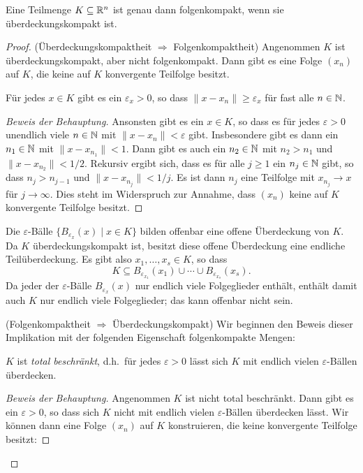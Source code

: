 \documentclass[a4paper,10pt]{article}
\begin{document}
\begin{prop}
 Eine Teilmenge $K \subseteq \mathbb{R}^n$ ist genau dann folgenkompakt, wenn sie überdeckungskompakt ist.
\end{prop}
\begin{proof}
 (Überdeckungskompaktheit $\Rightarrow$ Folgenkompaktheit) Angenommen $K$ ist überdeckungskompakt, aber nicht folgenkompakt. Dann gibt es eine Folge $(x_n)$ auf $K$, die keine auf $K$ konvergente Teilfolge besitzt.
 
 \begin{beh}
  Für jedes $x \in K$ gibt es ein $\varepsilon_x > 0$, so dass $\|x - x_n\| \geq \varepsilon_x$ für fast alle $n \in \mathbb{N}$.
 \end{beh}
 \begin{proof}[Beweis der Behauptung]
  Ansonsten gibt es ein $x \in K$, so dass es für jedes $\varepsilon > 0$ unendlich viele $n \in \mathbb{N}$ mit $\|x - x_n\| < \varepsilon$ gibt. Insbesondere gibt es dann ein $n_1 \in \mathbb{N}$ mit $\|x - x_{n_1}\| < 1$. Dann gibt es auch ein $n_2 \in \mathbb{N}$ mit $n_2 > n_1$ und $\|x - x_{n_2}\| < 1/2$. Rekursiv ergibt sich, dass es für alle $j \geq 1$ ein $n_j \in \mathbb{N}$ gibt, so dass $n_j > n_{j-1}$ und $\|x - x_{n_j}\| < 1/j$. Es ist dann $n_j$ eine Teilfolge mit $x_{n_j} \to x$ für $j \to \infty$. Dies steht im Widerspruch zur Annahme, dass $(x_n)$ keine auf $K$ konvergente Teilfolge besitzt.
 \end{proof}
 
 Die $\varepsilon$-Bälle $\{B_{\varepsilon_x}(x) \mid x \in K\}$ bilden offenbar eine offene Überdeckung von $K$. Da $K$ überdeckungskompakt ist, besitzt diese offene Überdeckung eine endliche Teilüberdeckung. Es gibt also $x_1, \dotsc, x_s \in K$, so dass
 \begin{equation}
  K \subseteq B_{\varepsilon_{x_1}}(x_1) \cup \dotsb \cup B_{\varepsilon_{x_s}}(x_s).
 \end{equation}
 Da jeder der $\varepsilon$-Bälle $B_{\varepsilon_x}(x)$ nur endlich viele Folgeglieder enthält, enthält damit auch $K$ nur endlich viele Folgeglieder; das kann offenbar nicht sein.
 
 (Folgenkompaktheit $\Rightarrow$ Überdeckungskompakt) Wir beginnen den Beweis dieser Implikation mit der folgenden Eigenschaft folgenkompakte Mengen:
 
 \begin{beh}
  $K$ ist \emph{total beschränkt}, d.h.\ für jedes $\varepsilon > 0$ lässt sich $K$ mit endlich vielen $\varepsilon$-Bällen überdecken.
 \end{beh}
 \begin{proof}[Beweis der Behauptung]
  Angenommen $K$ ist nicht total beschränkt. Dann gibt es ein $\varepsilon > 0$, so dass sich $K$ nicht mit endlich vielen $\varepsilon$-Bällen überdecken lässt. Wir können dann eine Folge $(x_n)$ auf $K$ konstruieren, die keine konvergente Teilfolge besitzt:
  

\end{proof}
\end{proof}
\end{document}
